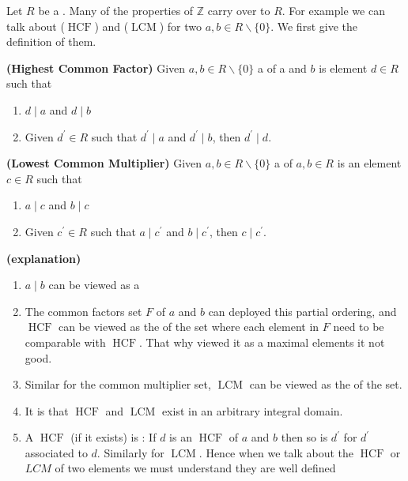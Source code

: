 \documentclass{article}
\newcommand{\bfs}[1]{\textbf{({#1}) }}
\newcommand{\HCF}{\operatorname{HCF}}
\newcommand{\LCM}{\operatorname{LCM}}
\begin{document}
Let $R$ be a . Many of the properties of $\mathbb{Z}$ carry over to $R$. For example we can talk about  ($\HCF$) and  ($\LCM$) for two $a, b \in R \backslash\{0\}$. We first give the definition of them.
\begin{defa}\bfs{Highest Common Factor}
Given $a, b \in R \backslash\{0\}$ a  of a and $b$ is element $d \in R$ such that
\begin{enumerate}
    \item  $d \mid a$ and $d \mid b$
    \item Given $d^{\prime} \in R$ such that $d^{\prime} \mid a$ and $d^{\prime} \mid b$, then $d^{\prime} \mid d$.
\end{enumerate}
\end{defa}
\begin{defa}\bfs{Lowest Common Multiplier}
Given $a, b \in R \backslash\{0\}$ a  of $a, b \in R$ is an element $c \in R$ such that
\begin{enumerate}
    \item $a \mid c$ and $b \mid c$
    \item Given $c^{\prime} \in R$ such that $a \mid c^{\prime}$ and $b \mid c^{\prime}$, then $c \mid c^{\prime}$.
\end{enumerate}
\end{defa}
\begin{rema}\bfs{explanation}\label{rem:qjenkadda}
\begin{enumerate}
\item $a \mid b$ can be viewed as a 
    \item The common factors set $F$ of $a$ and $b$ can deployed this partial ordering, and $\HCF$ can be viewed as the  of the set where each element in $F$ need to be comparable with $\HCF$. That why viewed it as a maximal elements it not good. 
    \item Similar for the common multiplier set, $\LCM$ can be viewed as the  of the set.
    \item It is  that $\HCF$ and $\LCM$ exist in an arbitrary integral domain.
    \item A $\HCF$ (if it exists) is : If $d$ is an $\HCF$ of $a$ and $b$ then so is $d^{\prime}$ for $d^{\prime}$ associated to $d$. Similarly for $\LCM$. Hence when we talk about the $\HCF$ or $L C M$ of two elements we must understand they are well defined 
\end{enumerate}
\end{rema}
\end{document}
